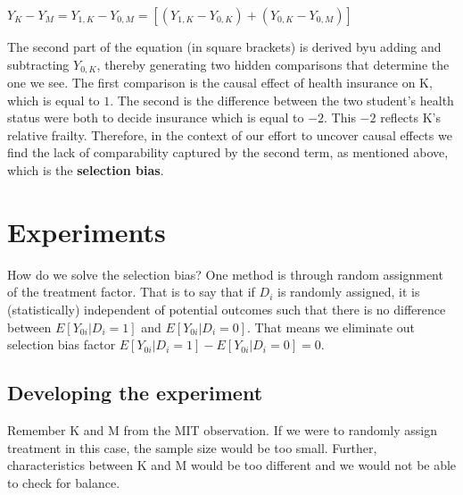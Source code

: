 \documentclass[12pt, letterpaper]{article}
\begin{document}
{\begin{center}
	$Y_K - Y_M = Y_{1,K} - Y_{0,M} = [(Y_{1,K} - Y_{0,K}) + (Y_{0,K} - Y_{0,M})]$
\end{center}
The second part of the equation (in square brackets) is derived byu adding and subtracting $Y_{0,K}$, thereby generating two hidden comparisons that determine the one we see. The first comparison is the causal effect of health insurance on K, which is equal to $1$. The second is the difference between the two student's health status were both to decide insurance which is equal to $-2$. This $-2$ reflects K's relative frailty. Therefore, in the context of our effort to uncover causal effects we find the lack of comparability captured by the second term, as mentioned above, which is the \textbf{selection bias}.

\section{Experiments}
How do we solve the selection bias? One method is through random assignment of the treatment factor. That is to say that if $D_i$ is randomly assigned, it is (statistically) independent of potential outcomes such that there is no difference between $E[Y_{0i}|D_{i}=1]$ and $E[Y_{0i}|D_{i}=0]$. That means we eliminate out selection bias factor $E[Y_{0i}|D_i=1]-E[Y_{0i}|D_i=0]=0$.

\subsection{Developing the experiment}
Remember K and M from the MIT observation. If we were to randomly assign treatment in this case, the sample size would be too small. Further, characteristics between K and M would be too different and we would not be able to check for balance.

}
\end{document}
